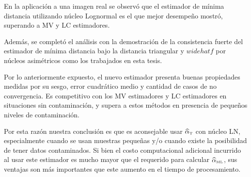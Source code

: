 En la aplicación a una imagen real se observó que el estimador de mínima distancia utilizando núcleo Lognormal es el que mejor desempeño mostró, superando a MV y LC estimadores.

Además, se completó el análisis con la demostración de la consistencia fuerte del estimador de mínima distancia bajo la distancia triangular y $widehat{f}$ por núcleos asimétricos como los trabajados en esta tesis.

Por lo anteriormente expuesto, el nuevo estimador presenta buenas propiedades medidas por su sesgo, error cuadrático medio y cantidad de casos de no convergencia. Es competitivo con los MV estimadores y LC estimadores en situaciones sin contaminación, y supera a estos métodos en presencia de pequeños niveles de contaminación.

Por esta razón nuestra conclusión es que es aconsejable usar $\widehat{\alpha}_{\text{\tiny{T}}} $ con núcleo LN, especialmente cuando se usan muestras pequeñas y/o cuando existe la posibilidad de tener datos contaminados. Si bien el costo computacional adicional incurrido al usar este estimador es mucho mayor que el requerido para calcular $\widehat{\alpha}_{\text{\tiny{ML}}}$, sus ventajas son más importantes que este aumento en el tiempo de procesamiento.